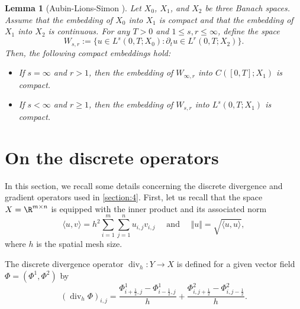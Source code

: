 \documentclass[final,reqno]{amsart}
\theoremstyle{plain}
\newtheorem{lemma}{Lemma}	%
\theoremstyle{definition}
\theoremstyle{remark}
\numberwithin{remark}{section}	%
\numberwithin{example}{section}	%
\DeclareMathOperator{\dive}{div}
\begin{document}
\begin{lemma}[Aubin-Lions-Simon \cite{LionsLivre}]\label{lem:ALS}
Let $X_0$, $X_1$, and $X_2$ be three Banach spaces. Assume that the embedding of $X_0$ into $X_1$ is compact and that the embedding of $X_1$ into $X_2$ is continuous. For any $T > 0$ and $1 \leq s, r \leq \infty$, define the space
\[
    W_{s,r} := \{u \in L^s(0,T; X_0) : \partial_t u \in L^r(0,T; X_2)\}.
\]
Then, the following compact embeddings hold:
\begin{itemize}
    \item If $s = \infty$ and $r > 1$, then the embedding of $W_{\infty,r}$ into $C([0,T]; X_1)$ is compact.
    \item If $s < \infty$ and $r \geq 1$, then the embedding of $W_{s,r}$ into $L^s(0,T; X_1)$ is compact.
\end{itemize}
\end{lemma}
\section{On the discrete operators}\label{section:discrete_op}
\setcounter{proposition}{0}
\renewcommand{\theproposition}{\Alph{section}\arabic{proposition}}

In this section, we recall some details concerning the discrete divergence and gradient operators used in \cref{section:4}. First, let us recall that the space $X = \R^{m\times n}$ is equipped with the inner product and its associated norm
\[
\langle u,v \rangle = h^2\sum_{i=1}^{m}\sum_{j=1}^{n} u_{i,j} v_{i,j} \quad \mbox{ and } \quad \Vert u\Vert = \sqrt{\langle u, u\rangle},
\] 
where $h$ is the spatial mesh size. 

The discrete divergence operator $\dive_h : Y \longrightarrow X$ is defined for a given vector field $\Phi = (\Phi^1, \Phi^2)$ by
\begin{equation}\label{eq:div1}
    (\dive_h\Phi)_{i, j} = \frac{\Phi^{1}_{i+\frac{1}{2},j} - \Phi^{1}_{i-\frac{1}{2},j}}{h}  +\frac{\Phi^{2}_{i,j+\frac{1}{2}} - \Phi^{2}_{i,j-\frac{1}{2}}}{h}.
\end{equation}
\end{document}
